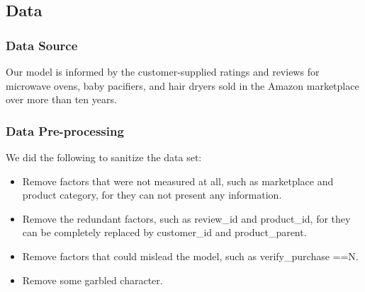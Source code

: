 \documentclass{mcmthesis}
\begin{document}
\subsection{Data}
\subsubsection{Data Source}
Our model is informed by the customer-supplied ratings and reviews for microwave ovens, baby pacifiers, and hair dryers sold in the Amazon marketplace over more than ten years.
\subsubsection{Data Pre-processing}
We did the following to sanitize the data set:
\begin{itemize}
  \item Remove factors that were not measured at all, such as marketplace and product category, for they can not present any information.
  
  \item Remove the redundant factors, such as review\_id and product\_id, for they can be completely replaced by customer\_id and product\_parent.
  
  \item Remove factors that could mislead the model, such as verify\_purchase ==N.
  
  \item Remove some garbled character.
\end{itemize}
\end{document}
